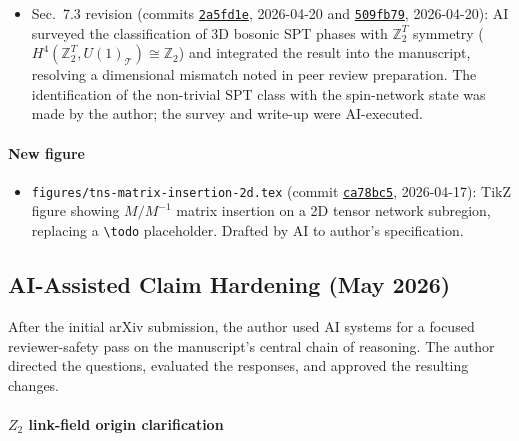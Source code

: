\documentclass[preprint]{SciPost}
\theoremstyle{plain} %
\begin{document}
\begin{itemize}
\item Sec.~7.3 revision (commits \href{https://github.com/space-cadet/timesarrow/commit/2a5fd1e}{\texttt{2a5fd1e}}, 2026-04-20 and \href{https://github.com/space-cadet/timesarrow/commit/509fb79}{\texttt{509fb79}}, 2026-04-20): AI surveyed the classification of 3D bosonic SPT phases with $\mathbb{Z}_2^T$ symmetry ($H^4(\mathbb{Z}_2^T, U(1)_{\mathcal{T}}) \cong \mathbb{Z}_2$) and integrated the result into the manuscript, resolving a dimensional mismatch noted in peer review preparation. The identification of the non-trivial SPT class with the spin-network state was made by the author; the survey and write-up were AI-executed.
\end{itemize}

\paragraph{New figure}

\begin{itemize}
\item \texttt{figures/tns-matrix-insertion-2d.tex} (commit \href{https://github.com/space-cadet/timesarrow/commit/ca78bc5}{\texttt{ca78bc5}}, 2026-04-17): TikZ figure showing $M/M^{-1}$ matrix insertion on a 2D tensor network subregion, replacing a \texttt{\textbackslash todo} placeholder. Drafted by AI to author's specification.
\end{itemize}

\subsection*{AI-Assisted Claim Hardening (May 2026)}

After the initial arXiv submission, the author used AI systems for a focused reviewer-safety pass on the manuscript's central chain of reasoning. The author directed the questions, evaluated the responses, and approved the resulting changes.

\paragraph{$Z_2$ link-field origin clarification}
\end{document}
